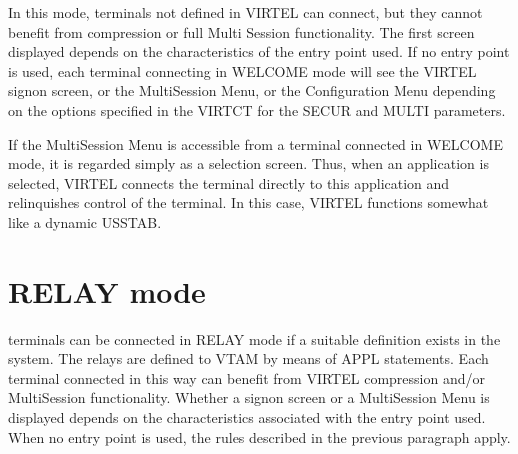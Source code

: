 \documentclass[letterpaper,10pt,english]{sphinxmanual}
\begin{document}
\sphinxAtStartPar
In this mode, terminals not defined in VIRTEL can connect, but they cannot benefit from compression or full Multi\sphinxhyphen{}
Session functionality. The first screen displayed depends on the characteristics of the entry point used. If no entry
point is used, each terminal connecting in WELCOME mode will see the VIRTEL sign\sphinxhyphen{}on screen, or the Multi\sphinxhyphen{}Session
Menu, or the Configuration Menu depending on the options specified in the VIRTCT for the SECUR and MULTI
parameters.

\sphinxAtStartPar
If the Multi\sphinxhyphen{}Session Menu is accessible from a terminal connected in WELCOME mode, it is regarded simply as a
selection screen. Thus, when an application is selected, VIRTEL connects the terminal directly to this application and
relinquishes control of the terminal. In this case, VIRTEL functions somewhat like a dynamic USSTAB.

\ignorespaces 

\section{RELAY mode}
\label{\detokenize{connectivity_guide:relay-mode}}\label{\detokenize{connectivity_guide:index-140}}
 terminals can be connected in RELAY mode if a suitable definition exists in the system. The relays are defined to VTAM by means of APPL statements. Each terminal connected in this way can benefit from VIRTEL compression and/or Multi\sphinxhyphen{}Session functionality. Whether a sign\sphinxhyphen{}on screen or a Multi\sphinxhyphen{}Session Menu is displayed depends on the characteristics associated with the entry point used. When no entry point is used, the rules described in the previous paragraph apply.

\ignorespaces 
\end{document}
